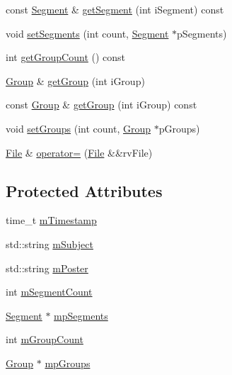 \begin{DoxyCompactItemize}
\item 
const \hyperlink{class_n_z_b_1_1_segment}{Segment} \& \hyperlink{class_n_z_b_1_1_file_a092df4f0a0e79ebf21c033f45d83b67f}{get\+Segment} (int i\+Segment) const
\item 
void \hyperlink{class_n_z_b_1_1_file_a35796f99c09199259761c16295635349}{set\+Segments} (int count, \hyperlink{class_n_z_b_1_1_segment}{Segment} $\ast$p\+Segments)
\item 
int \hyperlink{class_n_z_b_1_1_file_a423866b094bc656afbb4cf6a3667c8b6}{get\+Group\+Count} () const
\item 
\hyperlink{class_n_z_b_1_1_group}{Group} \& \hyperlink{class_n_z_b_1_1_file_a7baaa4ddddfbe5a63671329cf239d8f5}{get\+Group} (int i\+Group)
\item 
const \hyperlink{class_n_z_b_1_1_group}{Group} \& \hyperlink{class_n_z_b_1_1_file_a286c4fc01910d1c1e9d70369d768b641}{get\+Group} (int i\+Group) const
\item 
void \hyperlink{class_n_z_b_1_1_file_a3316ed024ea100d7afefcc9f5bcba25f}{set\+Groups} (int count, \hyperlink{class_n_z_b_1_1_group}{Group} $\ast$p\+Groups)
\item 
\hyperlink{class_n_z_b_1_1_file}{File} \& \hyperlink{class_n_z_b_1_1_file_a29355ed8ab7a8bd97588b8a1ade358de}{operator=} (\hyperlink{class_n_z_b_1_1_file}{File} \&\&rv\+File)
\end{DoxyCompactItemize}
\subsection*{Protected Attributes}
\begin{DoxyCompactItemize}
\item 
time\+\_\+t \hyperlink{class_n_z_b_1_1_file_a57e957204ffcb538b70c98a9c000e6ab}{m\+Timestamp}
\item 
std\+::string \hyperlink{class_n_z_b_1_1_file_a426bdfb4be69a92a56afa2fe0d16e522}{m\+Subject}
\item 
std\+::string \hyperlink{class_n_z_b_1_1_file_ad50b2da39f242433c24ae28be16a2429}{m\+Poster}
\item 
int \hyperlink{class_n_z_b_1_1_file_a7b60730fb288ccc891a16256a935dbba}{m\+Segment\+Count}
\item 
\hyperlink{class_n_z_b_1_1_segment}{Segment} $\ast$ \hyperlink{class_n_z_b_1_1_file_ad8d7a8167b46230dd86439cb95a98cb7}{mp\+Segments}
\item 
int \hyperlink{class_n_z_b_1_1_file_aaf96258452951818ba93e90a5f0de6b6}{m\+Group\+Count}
\item 
\hyperlink{class_n_z_b_1_1_group}{Group} $\ast$ \hyperlink{class_n_z_b_1_1_file_a1afca4ebb4dd759001b70e64ae4c8136}{mp\+Groups}
\end{DoxyCompactItemize}


